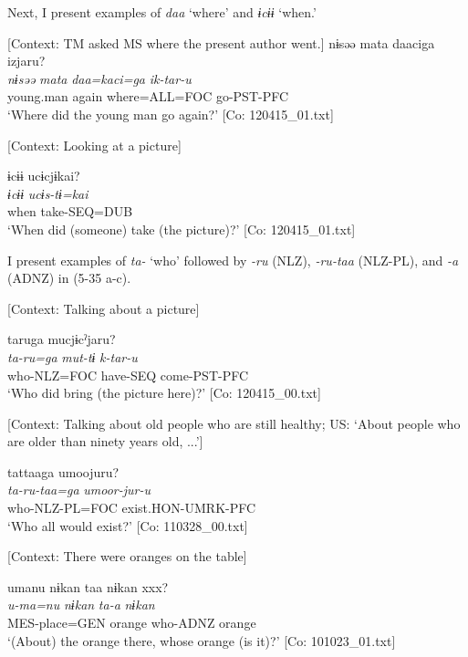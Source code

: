   Next, I present examples of \textit{daa} ‘where’ and \textit{ɨcɨɨ} ‘when.’

\ea \label{ex:5:34}  \ea \label{ex:5:a} [Context: TM asked MS where the present author went.]
\glll  nɨsəə  mata  daaciga  izjaru?\\
\textit{nɨsəə}  \textit{mata}  \textit{daa=kaci=ga}  \textit{ik-tar-u}\\
young.man  again  where=ALL=FOC  go-PST-PFC\\
\glt ‘Where did the young man go again?’ [Co: 120415\_01.txt]

 \ex \label{ex:5:b} [Context: Looking at a picture]

\glll  ɨcɨɨ  ucɨcjɨkai?\\
\textit{ɨcɨɨ}  \textit{ucɨs-tɨ=kai}\\
when  take-SEQ=DUB\\
\glt ‘When did (someone) take (the picture)?’ [Co: 120415\_01.txt]
\z
\z

  I present examples of \textit{ta-} ‘who’ followed by \textit{{}-ru} (NLZ), \textit{{}-ru-taa} (NLZ-PL), and \textit{{}-a} (ADNZ) in (5-35 a-c).

\ea \label{ex:5:35}  \ea \label{ex:5:a} [Context: Talking about a picture]

\glll  taruga  mucjɨ\footnotemark  cˀjaru?\\
\textit{ta-ru=ga}  \textit{mut-tɨ}  \textit{k-tar-u}\\
who-NLZ=FOC  have-SEQ  come-PST-PFC\\
\glt ‘Who did bring (the picture here)?’ [Co: 120415\_00.txt]

 \ex \label{ex:5:b} [Context: Talking about old people who are still healthy; US: ‘About people who are older than ninety years old, ...’]

\glll  tattaaga  umoojuru?\\
\textit{ta-ru-taa=ga}  \textit{umoor-jur-u}\\
who-NLZ-PL=FOC  exist.HON-UMRK-PFC\\
\glt ‘Who all would exist?’ [Co: 110328\_00.txt]

 \ex \label{ex:5:c} [Context: There were oranges on the table]

\glll  umanu  nɨkan  taa  nɨkan   xxx?\\
\textit{u-ma=nu}  \textit{nɨkan}  \textit{ta-a}  \textit{nɨkan}  \\
MES-place=GEN  orange  who-ADNZ  orange  \\
\glt ‘(About) the orange there, whose orange (is it)?’ [Co: 101023\_01.txt]
\z
\z

